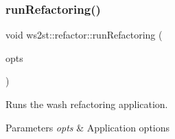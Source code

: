 \subsubsection{\texorpdfstring{run\+Refactoring()}{runRefactoring()}}
{\footnotesize\ttfamily void ws2st\+::refactor\+::run\+Refactoring (\begin{DoxyParamCaption}\item[{const \mbox{\hyperlink{structWashOptions}{Wash\+Options}} \&}]{opts }\end{DoxyParamCaption})}



Runs the wash refactoring application. 


\begin{DoxyParams}{Parameters}
{\em opts} & Application options \\
\hline
\end{DoxyParams}
